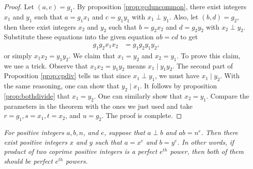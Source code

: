 \documentclass{subfile}
\begin{document}
	\begin{proof}
		Let $(a,c)=g_1$. By proposition \eqref{prop:gcduncommon}, there exist integers $x_1$ and $y_1$ such that $a=g_1x_1$ and $c=g_1y_1$ with $x_1\perp y_1$. Also, let $(b,d)=g_2$, then there exist integers $x_2$ and $y_2$ such that $b=g_2x_2$ and $d=g_2y_2$ with $x_2\perp y_2$. Substitute these equations into the given equation $ab=cd$ to get
		\begin{align*}
			g_1g_2x_1x_2 & =g_1g_2y_1y_2,
		\end{align*}
		or simply $x_1x_2 =y_1y_2$. We claim that $x_1=y_2$ and $x_2=y_1$. To prove this claim, we use a trick. Observe that $x_1x_2=y_1y_2$ means $x_1\mid y_1y_2$. The second part of Proposition \eqref{prop:cpdiv} tells us that since $x_1 \perp y_1$, we must have $x_1\mid y_2$. With the same reasoning, one can show that $y_2\mid x_1$. It follows by proposition \eqref{prop:bothdivide} that $x_1 =y_2$. One can similarly show that $x_2=y_1$. Compare the  parameters in the theorem with the ones we just used and take $r=g_1, s=x_1, t=x_2 $, and $u=g_2$. The proof is complete.
	\end{proof}

	\begin{theorem}\slshape
		For positive integers $a, b, n$, and $e$, suppose that $a\perp b$ and $ab=n^e$. Then there exist positive integers $x$ and $y$ such that $a=x^e$ and $b=y^e$. In other  words, if product of two coprime positive integers is a perfect $e^{th}$ power, then both of them should be perfect $e^{th}$ powers. \label{thm:copower}
	\end{theorem}
\end{document}
